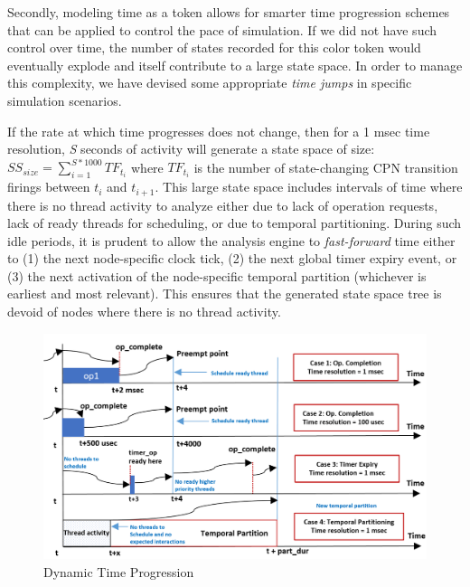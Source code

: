 Secondly, modeling time as a token allows for smarter time progression schemes that can be applied to control the pace of simulation. If we did not have such control over time, the number of states recorded for this color token would eventually explode and itself contribute to a large state space. In order to manage this complexity, we have devised some appropriate \emph{time jumps} in specific simulation scenarios. 

If the rate at which time progresses does not change, then for a 1 msec time resolution, \emph{S} seconds of activity will generate a state space of size: $SS_{size} = \sum\limits_{i=1}^{S*1000} TF_{t_i}$ where $TF_{t_i}$ is the number of state-changing CPN transition firings between $t_i$ and $t_{i+1}$. This large state space includes intervals of time where there is no thread activity to analyze either due to lack of operation requests, lack of ready threads for scheduling, or due to temporal partitioning. During such idle periods, it is prudent to allow the analysis engine to \emph{fast-forward} time either to (1) the next node-specific clock tick, (2) the next global timer expiry event, or (3) the next activation of the node-specific temporal partition (whichever is earliest and most relevant). This ensures that the generated state space tree is devoid of nodes where there is no thread activity.

\begin{figure}[h]
	\centering
	\includegraphics[width=\textwidth]{./img/time}
	\caption{Dynamic Time Progression}
	\label{fig:time}
\end{figure}


